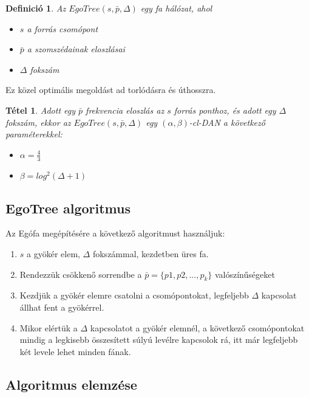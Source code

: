 \documentclass[12pt]{report}
\newtheorem{mydef}{Definició}
\newtheorem{mytetel}{Tétel}
\begin{document}
\begin{mydef}
	Az \(EgoTree(s, \bar{p}, \Delta) \) egy fa hálózat, ahol
	\begin{itemize}
		\item \(s\) a forrás csomópont
		\item \(\bar{p}\) a szomszédainak eloszlásai
		\item \(\Delta\) fokszám
	\end{itemize}
\end{mydef}

Ez közel optimális megoldást ad torlódásra és úthosszra.


\begin{mytetel}
	Adott egy  \(\bar{p}\) frekvencia eloszlás az \(s\) forrás ponthoz, és adott egy \(\Delta\) fokszám, ekkor az \(EgoTree(s, \bar{p}, \Delta)\) egy \((\alpha, \beta)\)-cl-DAN a következő paraméterekkel:
	\begin{itemize}
		\item \(\alpha = \frac{4}{3}\)
		\item \(\beta = log^2(\Delta + 1)\)
	\end{itemize}
\end{mytetel}

\subsection{EgoTree algoritmus}

Az Egófa megépítésére a következő algoritmust használjuk:

\begin{enumerate}
	\item \(s\) a gyökér elem, \(\Delta\) fokszámmal, kezdetben üres fa.
	\item Rendezzük csökkenő sorrendbe a \(\bar{p} = \{p1, p2, ..., p_k\}\) valószínűségeket 
	\item Kezdjük a gyökér elemre csatolni a csomópontokat, legfeljebb \(\Delta\) kapcsolat állhat fent a gyökérrel.
	\item Mikor elértük a \(\Delta\) kapcsolatot a gyökér elemnél, a következő csomópontokat mindig a legkisebb összesített súlyú levélre kapcsolok rá, itt már legfeljebb két levele lehet minden fának.
\end{enumerate}

\subsection{Algoritmus elemzése}
\end{document}
